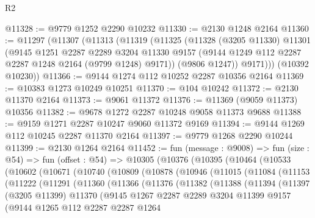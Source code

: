 \begin{lexlean}{R2}
\begin{coremodule}
@11328 := @9779 @1252 @2290 @10232
@11330 := @2130 @1248 @2164
@11360 := @11297
    (@11307
      (@11313
        (@11319
          (@11325
            (@11328
              (@3205 @11330)
              @11301
              (@9145
                @1251
                @2287
                @2289
                @3204
                @11330
                @9157
                (@9144 @1249 @112 @2287 @2287 @1248 @2164 (@9799 @1248) @9171))
              (@9806 @1247))
            @9171)))
      (@10392 @10230))
@11366 := @9144 @1274 @112 @10252 @2287 @10356 @2164
@11369 := @10383 @1273 @10249 @10251
@11370 := @104 @10242
@11372 := @2130 @11370 @2164
@11373 := @9061 @11372
@11376 := @11369 (@9059 @11373) @10356
@11382 := @9678 @1272 @2287 @10248 @9058 @11373 @9688
@11388 := @9159 @1271 @2287 @10247 @9060 @11372 @9169
@11394 := @9144 @1269 @112 @10245 @2287 @11370 @2164
@11397 := @9779 @1268 @2290 @10244
@11399 := @2130 @1264 @2164
@11452 := fun (message : @9008) =>
  fun (size : @54) =>
  fun (offset : @54) =>
  @10305
    (@10376
      (@10395
        (@10464
          (@10533
            (@10602
              (@10671
                (@10740
                  (@10809
                    (@10878
                      (@10946
                        (@11015
                          (@11084
                            (@11153
                              (@11222
                                (@11291
                                  (@11360
                                    (@11366
                                      (@11376
                                        (@11382
                                          (@11388
                                            (@11394
                                              (@11397
                                                (@3205 @11399)
                                                @11370
                                                (@9145
                                                  @1267
                                                  @2287
                                                  @2289
                                                  @3204
                                                  @11399
                                                  @9157
                                                  (@9144
                                                    @1265
                                                    @112
                                                    @2287
                                                    @2287
                                                    @1264

\end{coremodule}
\end{lexlean}
